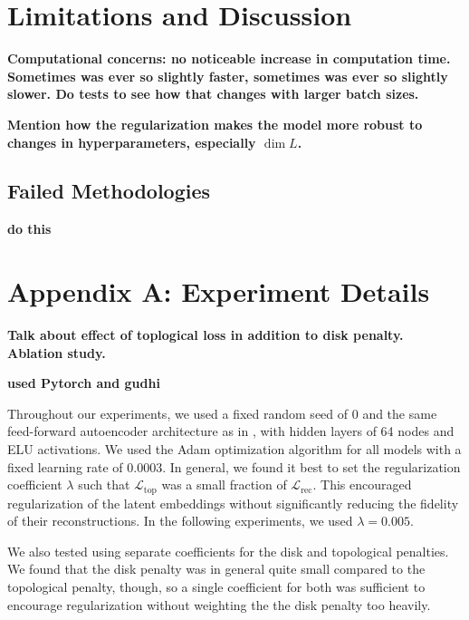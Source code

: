 \documentclass[conference]{IEEEtran}
\newcommand{\warn}[1]{\textbf{\color{red}#1}}
\begin{document}
\section{Limitations and Discussion}

\warn{Computational concerns: no noticeable increase in computation time. Sometimes was ever so slightly faster, sometimes was ever so slightly slower. Do tests to see how that changes with larger batch sizes.}

\warn{Mention how the regularization makes the model more robust to changes in hyperparameters, especially $\dim L$.}

\subsection{Failed Methodologies}

\warn{do this}

\section*{Appendix A: Experiment Details}
\label{experiment-details}

\warn{Talk about effect of toplogical loss in addition to disk penalty. Ablation study.}

\warn{used Pytorch and gudhi}

Throughout our experiments, we used a fixed random seed of 0 and the same feed-forward autoencoder architecture as in , with hidden layers of 64 nodes and ELU activations. We used the Adam optimization algorithm for all models with a fixed learning rate of $0.0003$. In general, we found it best to set the regularization coefficient $\lambda$ such that $\mathcal{L}_{\text{top}}$ was a small fraction of $\mathcal{L}_{\text{rec}}$. This encouraged regularization of the latent embeddings without significantly reducing the fidelity of their reconstructions. In the following experiments, we used $\lambda = 0.005$.

We also tested using separate coefficients for the disk and topological penalties. We found that the disk penalty was in general quite small compared to the topological penalty, though, so a single coefficient for both was sufficient to encourage regularization without weighting the the disk penalty too heavily.
\end{document}
